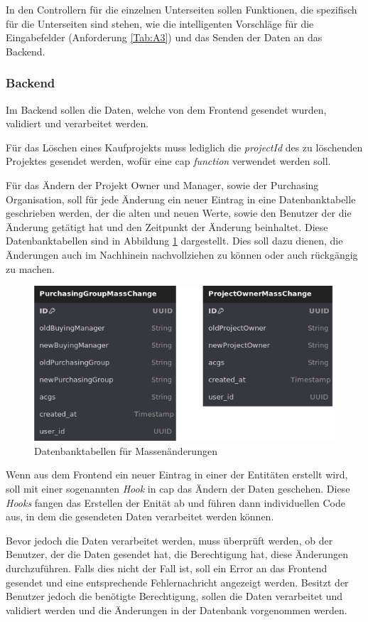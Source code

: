 In den Controllern für die einzelnen Unterseiten sollen Funktionen, die spezifisch für die Unterseiten sind stehen, wie die intelligenten Vorschläge für die Eingabefelder (Anforderung \ref{Tab:A3}) und das Senden der Daten an das Backend.

\subsubsection[Backend]{Backend}
Im Backend sollen die Daten, welche von dem Frontend gesendet wurden, validiert und verarbeitet werden.

Für das Löschen eines Kaufprojekts muss lediglich die \textit{projectId} des zu löschenden Projektes gesendet werden, wofür eine \gls{cap} \textit{function} verwendet werden soll.

Für das Ändern der Projekt Owner und Manager, sowie der Purchasing Organisation, soll für jede Änderung ein neuer Eintrag in eine Datenbanktabelle geschrieben werden, der die alten und neuen Werte, sowie den Benutzer der die Änderung getätigt hat und den Zeitpunkt der Änderung beinhaltet.
Diese Datenbanktabellen sind in Abbildung \ref{fig:masschangetables} dargestellt.
Dies soll dazu dienen, die Änderungen auch im Nachhinein nachvollziehen zu können oder auch rückgängig zu machen. 

\begin{figure}[H]
    \centering
    \includegraphics[width=.6\linewidth]{Images/MassChangeTables.png}
    \caption[Datenbanktabellen für Massenänderungen]{Datenbanktabellen für Massenänderungen}
    \label{fig:masschangetables}
\end{figure}

Wenn aus dem Frontend ein neuer Eintrag in einer der Entitäten erstellt wird, soll mit einer sogenannten \textit{Hook} in \gls{cap} das Ändern der Daten geschehen.
Diese \textit{Hooks} fangen das Erstellen der Enität ab und führen dann individuellen Code aus, in dem die gesendeten Daten verarbeitet werden können.

Bevor jedoch die Daten verarbeitet werden, muss überprüft werden, ob der Benutzer, der die Daten gesendet hat, die Berechtigung hat, diese Änderungen durchzuführen.
Falls dies nicht der Fall ist, soll ein Error an das Frontend gesendet und eine entsprechende Fehlernachricht angezeigt werden.
Besitzt der Benutzer jedoch die benötigte Berechtigung, sollen die Daten verarbeitet und validiert werden und die Änderungen in der Datenbank vorgenommen werden.

